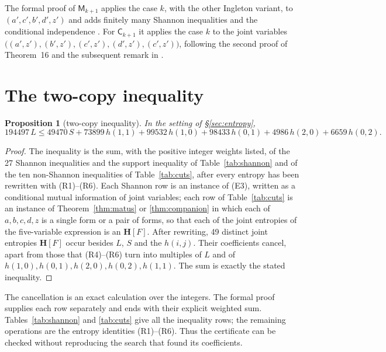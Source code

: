 \documentclass[11pt]{amsart}
\newtheorem{proposition}[theorem]{Proposition}
\theoremstyle{definition}
\theoremstyle{remark}
\numberwithin{equation}{section}
\newcommand{\Hb}{\mathbf{H}}
\begin{document}
The formal proof of $\mathsf M_{k+1}$ applies the case $k$, with the other Ingleton variant, to
$(a',c',b',d',z')$ and adds finitely many Shannon inequalities and the conditional independence
\cite[proof of Theorem~22]{CC}. For $\mathsf C_{k+1}$ it applies the case $k$ to the joint variables
$\bigl((a',z'),(b',z'),(c',z'),(d',z'),(c',z')\bigr)$, following the second proof of Theorem~16 and the subsequent remark in \cite{CC}.

\section{The two-copy inequality}\label{sec:lemmaA}

\begin{proposition}[two-copy inequality]\label{prop:A}
In the setting of \S\ref{sec:entropy},
\[
  194497\,L\le 49470\,S+73899\,h(1,1)+99532\,h(1,0)+98433\,h(0,1)+4986\,h(2,0)+6659\,h(0,2).
\]
\end{proposition}

\begin{proof}
The inequality is the sum, with the positive integer weights listed, of the 27 Shannon
inequalities and the support inequality of Table~\ref{tab:shannon} and of the ten non-Shannon
inequalities of Table~\ref{tab:cuts}, after every entropy has been rewritten with (R1)--(R6). Each
Shannon row is an instance of (E3), written as a conditional mutual information of joint
variables; each row of Table~\ref{tab:cuts} is an instance of Theorem~\ref{thm:matus} or
\ref{thm:companion} in which each of $a,b,c,d,z$ is a single form or a pair of forms, so that each
of the joint entropies of the five-variable expression is an $\Hb[F]$. After rewriting, 49
distinct joint entropies $\Hb[F]$ occur besides $L$, $S$ and the $h(i,j)$. Their coefficients
cancel, apart from those that (R4)--(R6) turn into multiples of $L$ and of
$h(1,0),h(0,1),h(2,0),h(0,2),h(1,1)$. The sum is exactly the stated inequality.
\end{proof}

The cancellation is an exact calculation over the integers. The
formal proof supplies each row separately and ends with their explicit
weighted sum. Tables~\ref{tab:shannon} and \ref{tab:cuts} give all the
inequality rows; the remaining operations are the entropy identities
(R1)--(R6). Thus the certificate can be checked without reproducing
the search that found its coefficients.
\end{document}
